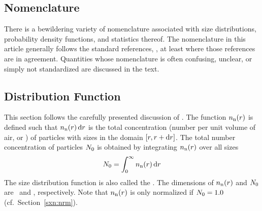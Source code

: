 \documentclass[12pt,twoside]{article}
\begin{document}
\subsection[Nomenclature]{Nomenclature}
There is a bewildering variety of nomenclature associated with size
distributions, probability density functions, and statistics thereof.
The nomenclature in this article generally follows the standard
references, \cite[see, e.g.,][]{HaT74,PaG77,PFT88,FTV89,SeP97}, at
least where those references are in agreement. 
Quantities whose nomenclature is often confusing, unclear, or simply
not standardized are discussed in the text.

\subsection[Distribution Function]{Distribution Function}
This section follows the carefully presented discussion of
\cite{FTV89}.
The  function $n_{\mathrm{n}}(r)$ is defined such that
$n_{\mathrm{n}}(r)\,\mathrm{d}r$ is the total concentration (number per unit volume
of air, or \nbrxmC) of particles with sizes in the domain
$[r,r+\mathrm{d}r]$. 
The total number concentration of particles $N_{0}$ is obtained by
integrating $n_{\mathrm{n}}(r)$ over all sizes
\begin{equation}
N_{0} = \int_{0}^{\infty} n_{\mathrm{n}}(r) \,\mathrm{d}r
\label{eqn:cnc_ttl_dfn}
\end{equation}
The size distribution function is also called the .
The dimensions of $n_{\mathrm{n}}(r)$ and $N_{0}$ are \nbrxmCm\ and
\nbrxmC, respectively.
Note that $n_{\mathrm{n}}(r)$ is only normalized if $N_{0} = 1.0$ 
(cf.\ Section~\ref{sxn:nrm}). 
\end{document}
